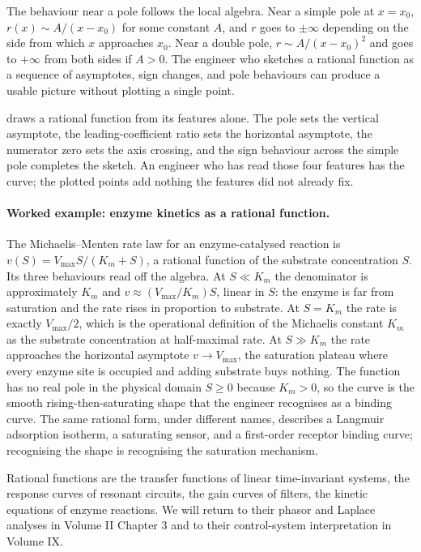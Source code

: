 The behaviour near a pole follows the local algebra. Near a simple
pole at $x = x_{0}$, $r(x) \sim A/(x - x_{0})$ for some constant $A$,
and $r$ goes to $\pm \infty$ depending on the side from which $x$
approaches $x_{0}$. Near a double pole, $r \sim A/(x - x_{0})^{2}$
and goes to $+\infty$ from both sides if $A > 0$. The engineer who
sketches a rational function as a sequence of asymptotes, sign
changes, and pole behaviours can produce a usable picture without
plotting a single point.



 draws a rational function
from its features alone. The pole sets the vertical asymptote, the
leading-coefficient ratio sets the horizontal asymptote, the
numerator zero sets the axis crossing, and the sign behaviour across
the simple pole completes the sketch. An engineer who has read those
four features has the curve; the plotted points add nothing the
features did not already fix.

\paragraph{Worked example: enzyme kinetics as a rational function.}
The Michaelis--Menten rate law for an enzyme-catalysed reaction is
$v(S) = V_{\max} S/(K_{m} + S)$, a rational function of the substrate
concentration $S$. Its three behaviours read off the algebra. At
$S \ll K_{m}$ the denominator is approximately $K_{m}$ and $v \approx
(V_{\max}/K_{m}) S$, linear in $S$: the enzyme is far from saturation
and the rate rises in proportion to substrate. At $S = K_{m}$ the
rate is exactly $V_{\max}/2$, which is the operational definition of
the Michaelis constant $K_{m}$ as the substrate concentration at
half-maximal rate. At $S \gg K_{m}$ the rate approaches the
horizontal asymptote $v \to V_{\max}$, the saturation plateau where
every enzyme site is occupied and adding substrate buys nothing. The
function has no real pole in the physical domain $S \geq 0$ because
$K_{m} > 0$, so the curve is the smooth rising-then-saturating shape
that the engineer recognises as a binding curve. The same rational
form, under different names, describes a Langmuir adsorption
isotherm, a saturating sensor, and a first-order receptor binding
curve; recognising the shape is recognising the saturation mechanism.

Rational functions are the transfer functions of linear time-invariant
systems, the response curves of resonant circuits, the gain curves of
filters, the kinetic equations of enzyme reactions. We will return to
their phasor and Laplace analyses in Volume II Chapter 3 and to their
control-system interpretation in Volume IX.

